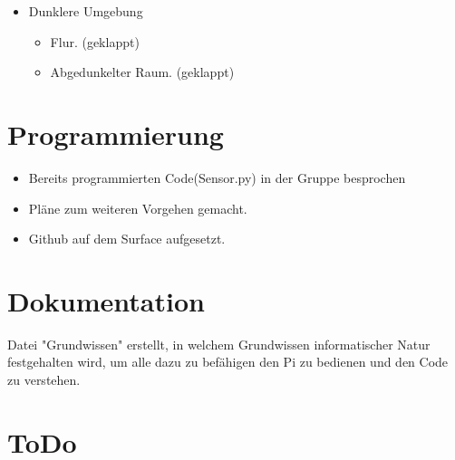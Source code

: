 \documentclass{article}
\begin{document}
\begin{itemize}

\item Dunklere Umgebung 
\begin{itemize}

\item Flur. (geklappt)

\item Abgedunkelter Raum. (geklappt)

\end{itemize}

\end{itemize}

\section{Programmierung}

\begin{itemize}

\item Bereits programmierten Code(Sensor.py) in der Gruppe besprochen 

\item Pläne zum weiteren Vorgehen gemacht.

\item Github auf dem Surface aufgesetzt.

\end{itemize}

\section{Dokumentation}

Datei "Grundwissen" erstellt, in welchem Grundwissen informatischer Natur festgehalten wird, um alle dazu zu befähigen den Pi zu bedienen und den Code zu verstehen.

\section{ToDo}
\end{document}
